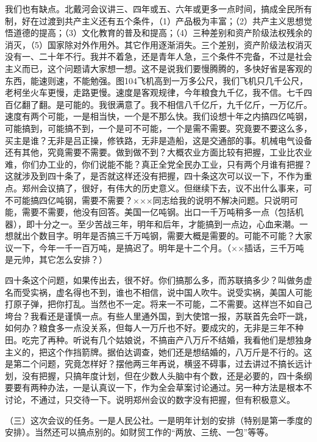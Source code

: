 我们也有缺点。北戴河会议讲三、四年或五、六年或更多一点时间，搞成全民所有制，好在过渡到共产主义还有五个条件，（1）产品极为丰富；（2）共产主义思想觉悟道德的提高；（3）文化教育的普及和提高；（4）三种差别和资产阶级法权残余的消灭，（5）国家除对外作用外。其它作用逐渐消失。三个差别，资产阶级法权消灭没有一、二十年不行。我并不着急，还是青年人急，三个条件不完备，不过是社会主义而已，这个问题请大家想一想。这不是说我们要慢腾腾的，多快好省是客观的东西，能速则速，不能勉强。图104飞机高到一万多公尺，我们飞机只几千公尺，老柯坐火车更慢，走路更慢。速度是客观规律，今年粮食九千亿，我不信。七千四百亿翻了翻。是可能的。我很满意了。我不相信八千亿斤，九千亿斤，一万亿斤。速度有两个可能，一是相当快，一个是不那么快。我们设想十年之内搞四亿吨钢，可能搞到，可能搞不到，一个是可不可能，一个是需不需要。究竟要不要这么多，买主是谁？无非是吕正操，修铁路，无非是造船，这是交通部的事。机械电气设备还有其他，究竟需要不需要。做到做不到？大概农业方面比较有把握，工业比农业难，你们办工业的，你们说能不能？真正全党全民办工业，只有两个月谁有把握？这就涉及到四十条了，是否就这样还没有把握，四十条这次可以议一下，不作为重点。郑州会议搞了，很好，有伟大的历史意义。但继续下去，议不出什么事来，可不可能搞四亿吨钢，需要不需要？×××同志给我的说明不解决问题。只说明可能，需要不需要，他没有回答。美国一亿吨钢。出口一千万吨稍多一点（包括机器），即十分之一。至少苦战三年，明年和后年，才能搞到一点边，心血来潮。一想就出个数目字。明年是否搞三千万吨钢，需要大概是需要的。可能不可能？大家议一下，今年一千一百万吨，是搞迟了。明年是十二个月。（××插话，三千万吨是元帅，其它怎么安排？）

四十条这个问题，如果传出去，很不好。你们搞那么多，而苏联搞多少？叫做务虚名而受实祸，虚名得也不到，谁也不相信，说中国人吹牛。说受实祸，美国人可能打原子弹，把你打乱。当然也不一定。将来一不可能，二不需要。这样岂不如自己垮台？我看还是谨慎一点。有些人里通外国，到大使馆一报，苏联首先会吓一跳，如何办？粮食多一点没关系，但每人一万斤也不好。要成灾的，无非是三年不种田。吃完了再种。听说有几个姑娘说，不搞亩产八万斤不结婚，我看他们是想独身主义的，把这个作挡箭牌。据伯达调查，她们还是想结婚的，八万斤是不行的。这是第二个问题，究竟怎样好？摆他两三年再说，横竖不碍事，过去讲过不搞长远计划，没有把握，只搞年度计划，但在少数人头脑中有个数，还是必要的，四十条纲要要有两种办法，一是认真议一下，作为全会草案讨论通过。另一种方法是根本不讨论，不通过，只交待一下。说明郑州会议的数字没有把握，但有积极意义。

（三）这次会议的任务。一是人民公社。一是明年计划的安排（特别是第一季度的安排）。当然还可以搞点别的。如财贸工作的“两放、三统、一包”等等。

